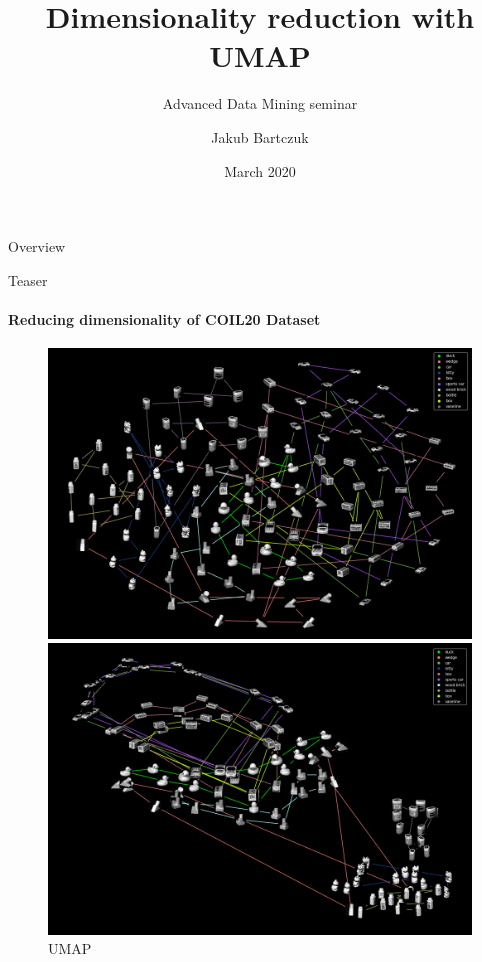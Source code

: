 \documentclass[unknownkeysallowed]{beamer}
\title{Dimensionality reduction with UMAP}
\subtitle{Advanced Data Mining seminar}
\author{Jakub Bartczuk}
\date{March 2020}
\begin{document}
\maketitle

\begin{frame}{Overview}
\end{frame}

\begin{frame}{Teaser}
\framesubtitle{Reducing dimensionality of COIL20 Dataset}
\begin{figure}[ht]\centering\begin{minipage}[b]{0.45\linewidth}\includegraphics[width=\textwidth]{coil_tsne.png}\caption{tSNE}\label{fig:minipage1}\end{minipage}\quad\begin{minipage}[b]{0.45\linewidth}\includegraphics[width=\textwidth]{coil_umap.png}\caption{UMAP}\label{fig:minipage2}\end{minipage}\end{figure}
\end{frame}
\end{document}
